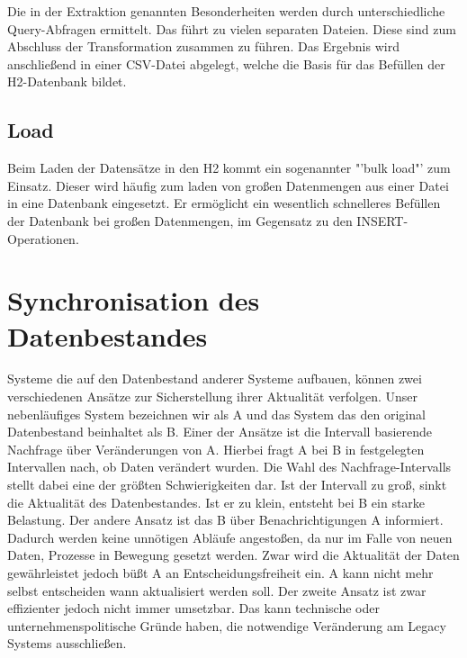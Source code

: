 Die in der Extraktion genannten Besonderheiten werden durch unterschiedliche Query-Abfragen ermittelt. Das führt zu vielen separaten Dateien. Diese sind zum Abschluss der Transformation zusammen zu führen. Das Ergebnis wird anschließend in einer CSV-Datei abgelegt, welche die Basis für das Befüllen der H2-Datenbank bildet. 

\subsection{Load}

Beim Laden der Datensätze in den H2 kommt ein sogenannter "'bulk load"' zum Einsatz. Dieser wird häufig zum laden von großen Datenmengen aus einer Datei in eine Datenbank eingesetzt. Er ermöglicht ein wesentlich schnelleres Befüllen der Datenbank bei großen Datenmengen, im Gegensatz zu den INSERT-Operationen.

\section{Synchronisation des Datenbestandes}

Systeme die auf den Datenbestand anderer Systeme aufbauen, können zwei verschiedenen Ansätze zur Sicherstellung ihrer Aktualität verfolgen. Unser nebenläufiges System bezeichnen wir als A und das System das den original Datenbestand beinhaltet als B. Einer der Ansätze ist die Intervall basierende Nachfrage über Veränderungen von A. Hierbei fragt A bei B in festgelegten Intervallen nach, ob Daten verändert wurden. Die Wahl des Nachfrage-Intervalls stellt dabei eine der größten Schwierigkeiten dar. Ist der Intervall zu groß, sinkt die Aktualität des Datenbestandes. Ist er zu klein, entsteht bei B ein starke Belastung. Der andere Ansatz ist das B über Benachrichtigungen A informiert. Dadurch werden keine unnötigen Abläufe angestoßen, da nur im Falle von neuen Daten, Prozesse in Bewegung gesetzt werden. Zwar wird die Aktualität der Daten gewährleistet jedoch büßt A an Entscheidungsfreiheit ein. A kann nicht mehr selbst entscheiden wann aktualisiert werden soll. Der zweite Ansatz ist zwar effizienter jedoch nicht immer umsetzbar. Das kann technische oder unternehmenspolitische Gründe haben, die notwendige Veränderung am Legacy Systems ausschließen.  

